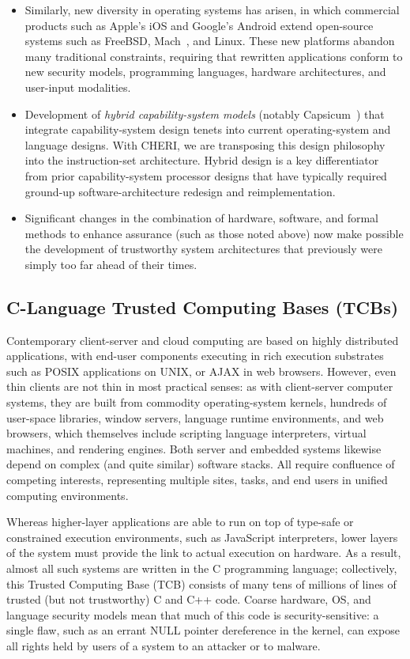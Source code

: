 \begin{itemize}
\item Similarly,
new diversity in operating systems has arisen, in which commercial
products such as Apple's iOS and Google's Android extend open-source systems
such as FreeBSD, Mach~\cite{accetta:mach}, and Linux.
These new platforms abandon many traditional constraints, requiring
that rewritten
applications conform to new security models, programming languages,
hardware architectures, and user-input modalities.

\item Development of {\em hybrid capability-system models} (notably Capsicum~\cite{Watson10}) that integrate capability-system design tenets into current operating-system and language designs.
With CHERI, we are transposing this design philosophy into the instruction-set architecture.
Hybrid design is a key differentiator from prior capability-system processor designs that have typically required ground-up software-architecture redesign and reimplementation.

\item Significant changes in the combination of hardware, software,
and formal methods to enhance assurance (such as those noted above)
now make possible the development of trustworthy system
architectures that previously were simply too far ahead of their times.
\end{itemize}

\subsection{C-Language Trusted Computing Bases (TCBs)}

Contemporary client-server and cloud computing are based on highly distributed
applications, with end-user components executing in rich execution substrates such
as POSIX applications on UNIX, or AJAX in web browsers.
However, even thin clients are not thin in most practical senses: as with client-server
computer systems, they are built from commodity operating-system kernels, hundreds
of user-space libraries, window servers, language runtime environments, and web
browsers, which themselves include scripting language interpreters, virtual machines,
and rendering engines.
Both server and embedded systems likewise depend on complex (and quite
similar) software stacks.
All require confluence of competing interests, representing multiple sites, tasks, and end users in unified computing environments.

Whereas higher-layer applications are able to run on top of type-safe or constrained
execution environments, such as JavaScript interpreters, lower layers of the system
must provide the link to actual execution on hardware.
As a result, almost all such systems are written in the C programming language;
collectively, this Trusted Computing Base (TCB) consists of many tens of millions of
lines of trusted (but not trustworthy) C and C++ code.
Coarse hardware, OS, and language security models mean that much of this code is
security-sensitive: a single flaw, such as an errant NULL pointer dereference in the kernel,
can expose all rights held by users of a system to an attacker or to malware.


